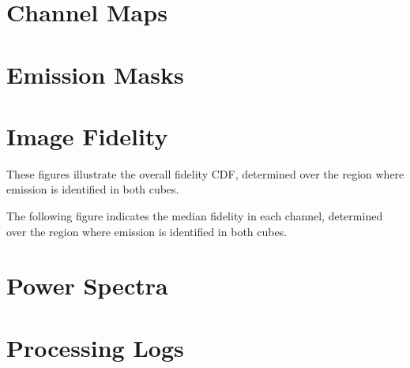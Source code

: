 \documentclass[11pt]{article}
\begin{document}
 
 
 
 

\section{Channel Maps}
\label{sect:channel_maps}
%

\section{Emission Masks}
\label{sect:emission_masks}
%

\section{Image Fidelity}
\label{sec:fidelity}
%
These figures illustrate the overall fidelity CDF, determined over the region where emission is identified in both cubes. 



The following figure indicates the median fidelity in each channel, determined over the region where emission is identified in both cubes. 


\section{Power Spectra}
\label{sec:powerspec}
%
%

\section{Processing Logs}
\label{sec:logs}

\end{document}

